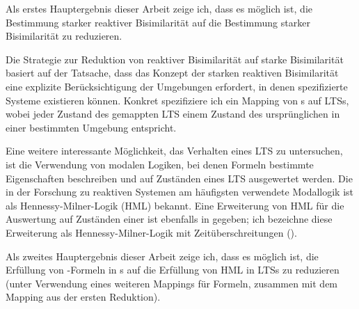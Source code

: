 Als erstes Hauptergebnis dieser Arbeit zeige ich, dass es möglich ist, die Bestimmung starker reaktiver Bisimilarität auf die Bestimmung starker \linebreak Bisimilarität zu reduzieren.

Die Strategie zur Reduktion von reaktiver Bisimilarität auf starke Bisimilarität basiert auf der Tatsache, dass das Konzept der starken reaktiven Bisimilarität eine explizite Berücksichtigung der Umgebungen erfordert, in denen spezifizierte Systeme existieren können. Konkret spezifiziere ich ein Mapping von \LTSt{}s auf LTSs, wobei jeder Zustand des gemappten LTS einem Zustand des ursprünglichen \LTSt{} in einer bestimmten Umgebung entspricht.

Eine weitere interessante Möglichkeit, das Verhalten eines LTS zu untersuchen, ist die Verwendung von modalen Logiken, bei denen Formeln bestimmte Eigenschaften beschreiben und auf Zuständen eines LTS ausgewertet werden. Die in der Forschung zu reaktiven Systemen am häufigsten verwendete Modallogik ist als Hennessy-Milner-Logik (HML) bekannt. 
Eine Erweiterung von HML für die Auswertung auf Zuständen einer \LTSt{} ist ebenfalls in \cite{rbs} gegeben; ich bezeichne diese Erweiterung als Hennessy-Milner-Logik mit Zeitüberschreitungen (\HMLt{}).

Als zweites Hauptergebnis dieser Arbeit zeige ich, dass es möglich ist, die Erfüllung von \HMLt{}-Formeln in \LTSt{}s auf die Erfüllung von HML in LTSs zu reduzieren (unter Verwendung eines weiteren Mappings für Formeln, zusammen mit dem Mapping aus der ersten Reduktion).

\thispagestyle{empty}
